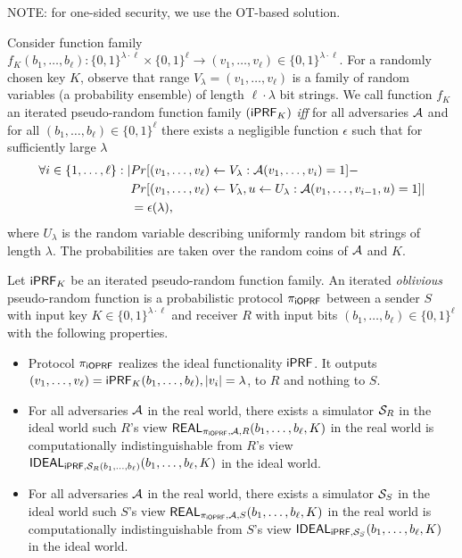 \documentclass{article}
\begin{document}
NOTE: for one-sided security, we use the OT-based solution.

\begin{definition}[$\iprf$]
  Consider function family
  $f_K(b_1,\ldots,b_\ell):\{0,1\}^{\lambda\cdot\ell}\times\{0,1\}^{\ell}\rightarrow{}(v_1,\ldots,v_\ell)\in\{0,1\}^{\lambda\cdot\ell}$. For a
  randomly chosen key $K$, observe that range
  $V_\lambda=(v_1,\ldots,v_\ell)$ is a family of random variables (a
  probability ensemble) of length $\ell\cdot\lambda$ bit strings. We
  call function $f_K$ an iterated pseudo-random function family
  $(\mathsf{i}\mathsf{PRF}_K)$ \emph{iff} for all adversaries ${\mathcal{A}}$ and for all
  $(b_1,\ldots,b_\ell)\in\{0,1\}^\ell$ there exists a negligible
  function $\epsilon$ such that for sufficiently large $\lambda$
\begin{align*}\forall{}i\in\{1,\ldots,\ell\}:|&Pr[(v_1,\ldots,v_\ell)\leftarrow{}V_\lambda:{\mathcal{A}}(v_1,\ldots,v_i)=1]-\\&Pr[(v_1,\ldots,v_\ell)\leftarrow{}V_\lambda,u\leftarrow{}U_\lambda:{\mathcal{A}}(v_1,\ldots,v_{i-1},u)=1]|\\&=\epsilon(\lambda),
  \end{align*}
  where $U_\lambda$ is the random variable describing uniformly random
  bit strings of length $\lambda$. The probabilities are taken over
  the random coins of ${\mathcal{A}}$ and $K$.

\end{definition}

\begin{definition}[$\proto$]
  Let $\mathsf{i}\mathsf{PRF}_K$ be an iterated pseudo-random function family.  An
  iterated \emph{oblivious} pseudo-random function is a probabilistic
  protocol $\proto$ between a sender $S$ with input key
  $K\in\{0,1\}^{\lambda\cdot\ell}$ and receiver $R$ with input bits
  $(b_1,\ldots,b_\ell)\in\{0,1\}^{\ell}$ with the following
  properties.

  \begin{itemize}
   
\item Protocol $\proto$ realizes the ideal functionality $\iprf$. It
  outputs
  $(v_1,\ldots,v_\ell)=\mathsf{i}\mathsf{PRF}_K(b_1,\ldots,b_\ell),|v_i|=\lambda$, to
  $R$ and nothing to $S$.
  
\item For all adversaries ${\mathcal{A}}$ in the real world, there exists a
  simulator ${\mathcal{S}}_R$ in the ideal world such $R$'s view
  $\mathsf{REAL}_{{\pi_{\mathsf{i}\mathsf{OPRF}}},{\mathcal{A}},R}(b_1,\ldots,b_\ell,K)$ in the real world is
  computationally indistinguishable from $R$'s view
  $\mathsf{IDEAL}_{\mathsf{i}\mathsf{PRF},{\mathcal{S}}_R(b_1,\ldots,b_\ell)}(b_1,\ldots,b_\ell,K)$ in
  the ideal world.

\item
   For all adversaries ${\mathcal{A}}$ in the real world, there exists a
  simulator ${\mathcal{S}}_S$ in the ideal world such $S$'s view
  $\mathsf{REAL}_{{\pi_{\mathsf{i}\mathsf{OPRF}}},{\mathcal{A}},S}(b_1,\ldots,b_\ell,K)$ in the real world is
  computationally indistinguishable from $S$'s view
  $\mathsf{IDEAL}_{\mathsf{i}\mathsf{PRF},{\mathcal{S}}_S}(b_1,\ldots,b_\ell,K)$ in
  the ideal world.  
\end{itemize}
\end{definition}
\end{document}
